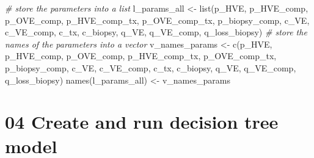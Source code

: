 \documentclass[
]{article}
\newenvironment{Shaded}{\begin{snugshade}}{\end{snugshade}}
\newcommand{\CommentTok}[1]{\textcolor[rgb]{0.56,0.35,0.01}{\textit{#1}}}
\newcommand{\FunctionTok}[1]{\textcolor[rgb]{0.00,0.00,0.00}{#1}}
\newcommand{\NormalTok}[1]{#1}
\newcommand{\OtherTok}[1]{\textcolor[rgb]{0.56,0.35,0.01}{#1}}
\newcommand{\StringTok}[1]{\textcolor[rgb]{0.31,0.60,0.02}{#1}}
\begin{document}
\begin{Shaded}
\begin{Highlighting}[]
\CommentTok{\# store the parameters into a list}
\NormalTok{l\_params\_all }\OtherTok{\textless{}{-}} \FunctionTok{list}\NormalTok{(p\_HVE, p\_HVE\_comp, p\_OVE\_comp, p\_HVE\_comp\_tx, }
\NormalTok{                     p\_OVE\_comp\_tx, p\_biopsy\_comp, }
\NormalTok{                     c\_VE, c\_VE\_comp, c\_tx, c\_biopsy, }
\NormalTok{                     q\_VE, q\_VE\_comp, q\_loss\_biopsy)}
\CommentTok{\# store the names of the parameters into a vector}
\NormalTok{v\_names\_params }\OtherTok{\textless{}{-}} \FunctionTok{c}\NormalTok{(}\StringTok{\textquotesingle{}p\_HVE\textquotesingle{}}\NormalTok{, }\StringTok{\textquotesingle{}p\_HVE\_comp\textquotesingle{}}\NormalTok{, }\StringTok{\textquotesingle{}p\_OVE\_comp\textquotesingle{}}\NormalTok{, }\StringTok{\textquotesingle{}p\_HVE\_comp\_tx\textquotesingle{}}\NormalTok{, }
                    \StringTok{\textquotesingle{}p\_OVE\_comp\_tx\textquotesingle{}}\NormalTok{, }\StringTok{\textquotesingle{}p\_biopsy\_comp\textquotesingle{}}\NormalTok{, }
                    \StringTok{\textquotesingle{}c\_VE\textquotesingle{}}\NormalTok{, }\StringTok{\textquotesingle{}c\_VE\_comp\textquotesingle{}}\NormalTok{,  }\StringTok{\textquotesingle{}c\_tx\textquotesingle{}}\NormalTok{, }\StringTok{\textquotesingle{}c\_biopsy\textquotesingle{}}\NormalTok{, }
                    \StringTok{\textquotesingle{}q\_VE\textquotesingle{}}\NormalTok{, }\StringTok{\textquotesingle{}q\_VE\_comp\textquotesingle{}}\NormalTok{, }\StringTok{\textquotesingle{}q\_loss\_biopsy\textquotesingle{}}\NormalTok{)}
\FunctionTok{names}\NormalTok{(l\_params\_all) }\OtherTok{\textless{}{-}}\NormalTok{ v\_names\_params}
\end{Highlighting}
\end{Shaded}

\hypertarget{create-and-run-decision-tree-model}{%
\section{04 Create and run decision tree
model}\label{create-and-run-decision-tree-model}}
\end{document}
